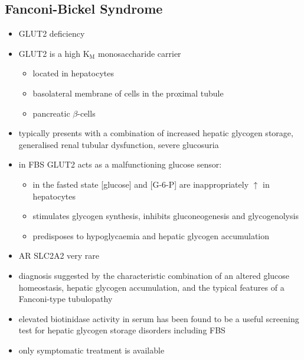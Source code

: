 \documentclass{scrartcl}
\begin{document}
\subsection{Fanconi-Bickel Syndrome}
\label{sec:orga006b2d}
\begin{itemize}
\item GLUT2 deficiency
\item GLUT2 is a high K\(_{\text{M}}\) monosaccharide carrier 
\begin{itemize}
\item located in hepatocytes
\item basolateral membrane of cells in the proximal tubule
\item pancreatic \(\beta\)-cells
\end{itemize}
\item typically presents with a combination of increased hepatic
glycogen storage, generalised renal tubular dysfunction, severe glucosuria
\item in FBS GLUT2 acts as a malfunctioning glucose sensor:
\begin{itemize}
\item in the fasted state [glucose] and [G-6-P] are inappropriately \(\uparrow\) in hepatocytes
\item stimulates glycogen synthesis, inhibits gluconeogenesis and glycogenolysis
\item predisposes to hypoglycaemia and hepatic glycogen accumulation
\end{itemize}
\item AR SLC2A2 very rare
\item diagnosis suggested by the characteristic combination of an altered
glucose homeostasis, hepatic glycogen accumulation, and the typical
features of a Fanconi-type tubulopathy
\item elevated biotinidase activity in serum has been found to be a useful
screening test for hepatic glycogen storage disorders including FBS
\item only symptomatic treatment is available
\end{itemize}
\end{document}
